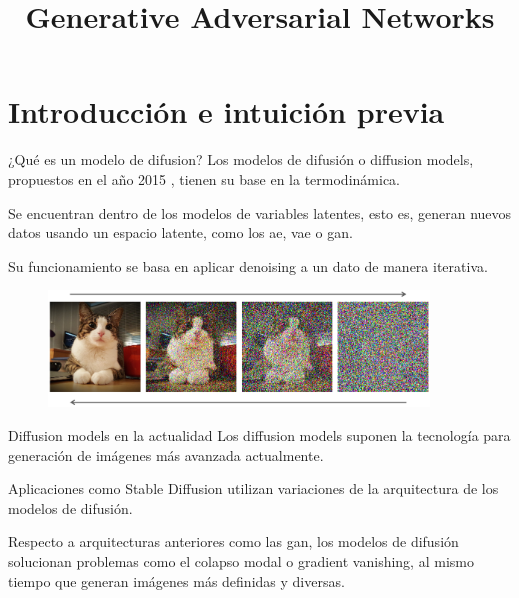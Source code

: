 



\title{Generative Adversarial Networks}


\maketitle

\section{Introducción e intuición previa}

\begin{frame}{¿Qué es un modelo de difusion?}
Los modelos de difusión o \alert{diffusion models}, propuestos en el año 2015 \cite{sohl2015deep}, tienen su base en la termodinámica.

Se encuentran dentro de los \alert{modelos de variables latentes}, esto es, generan nuevos datos usando un espacio latente, como los \gls{ae}, \gls{vae} o \gls{gan}.

Su funcionamiento se basa en aplicar \alert{denoising} a un dato de manera iterativa.

\begin{figure}
    \centering
    \includegraphics[width=0.9\textwidth]{figures/Diffusion_Models/Generation-with-Diffusion-Models.png}
    \caption{\cite{vahdat2022improving}}
\end{figure}
\end{frame}

\begin{frame}{Diffusion models en la actualidad}
Los diffusion models suponen la tecnología para generación de imágenes \alert{más avanzada} actualmente.

Aplicaciones como \alert{Stable Diffusion} utilizan variaciones de la arquitectura de los modelos de difusión.

Respecto a arquitecturas anteriores como las \gls{gan}, los modelos de difusión solucionan problemas como el \alert{colapso modal o gradient vanishing}, al mismo tiempo que generan imágenes \alert{más definidas y diversas}.
\end{frame}

